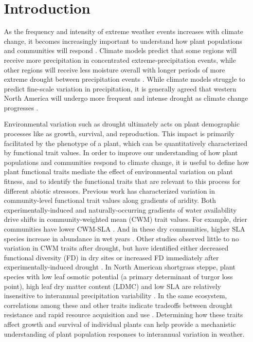\documentclass[12pt, letterpaper]{article}
\begin{document}
\section{Introduction}
As the frequency and intensity of extreme weather events increases with climate change, it becomes increasingly important to understand how plant populations and communities will respond \citep{Vicente-Serrano2020AWarming}. Climate models predict that some regions will receive more precipitation in concentrated extreme-precipitation events, while other regions will receive less moisture overall with longer periods of more extreme drought between precipitation events \citep{Knapp2008ConsequencesEcosystems}. While climate models struggle to predict fine-scale variation in precipitation, it is generally agreed that western North America will undergo more frequent and intense drought as climate change progresses \citep{Hartmann2013}. 

Environmental variation such as drought ultimately acts on plant demographic processes like as growth, survival, and reproduction. This impact is primarily facilitated by the phenotype of a plant, which can be quantitatively characterized by functional trait values. In order to improve our understanding of how plant populations and communities respond to climate change, it is useful to define how plant functional traits mediate the effect of environmental variation on plant fitness, and to identify the functional traits that are relevant to this process for different abiotic stressors. Previous work has characterized variation in community-level functional trait values along gradients of aridity. Both experimentally-induced and naturally-occurring gradients of water availability drive shifts in community-weighted mean (CWM) trait values. For example, drier communities have lower CWM-SLA \citep{Nunes2017WhichDrylands,Cornwell2009CommunityCalifornia}. And in these dry communities, higher SLA species increase in abundance in wet years \citep{Wilcox2020PlantPrairie}. Other studies observed little to no variation in CWM traits after drought, but have identified either decreased functional diversity (FD) in dry sites \citep{Luo2019LongGrasslands} or increased FD immediately after experimentally-induced drought \citep{Griffin-Nolan2019}. In North American shortgrass steppe, plant species with low leaf osmotic potential (a primary determinant of turgor loss point), high leaf dry matter content (LDMC) and low SLA are relatively insensitive to interannual precipitation variability \citep{Wilcox2020PlantPrairie}. In the same ecosystem, correlations among these and other traits indicate tradeoffs between drought resistance and rapid resource acquisition and use \citep{Blumenthal2020}. Determining how these traits affect growth and survival of individual plants can help provide a mechanistic understanding of plant population responses to interannual variation in weather.
\end{document}
